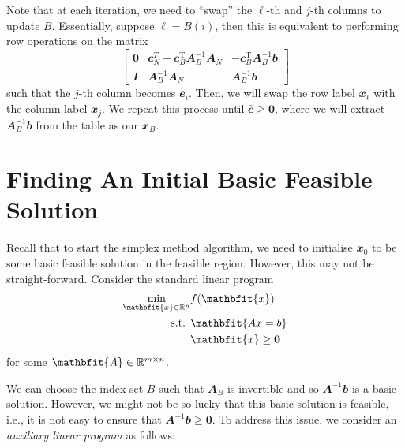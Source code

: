 \documentclass[math, code]{amznotes}
\theoremstyle{remark}
\begin{document}
Note that at each iteration, we need to ``swap'' the $\ell$-th and $j$-th columns to update $B$. Essentially, suppose $\ell = B(i)$, then this is equivalent to performing row operations on the matrix 
\begin{equation*}
    \begin{bmatrix}
        \mathbf{0} & \mathbfit{c}_N^{T} - \mathbfit{c}_B^{\mathrm{T}}\mathbfit{A}_B^{-1}\mathbfit{A}_N & -\mathbfit{c}_B^{\mathrm{T}}\mathbfit{A}_B^{-1}\mathbfit{b} \\
        \mathbfit{I} & \mathbfit{A}_B^{-1}\mathbfit{A}_N & \mathbfit{A}_B^{-1}\mathbfit{b}
    \end{bmatrix}
\end{equation*}
such that the $j$-th column becomes $\mathbfit{e}_{i}$. Then, we will swap the row label $\mathbfit{x}_{\ell}$ with the column label $\mathbfit{x}_j$. We repeat this process until $\mathbfit{\bar{c}} \geq \mathbf{0}$, where we will extract $\mathbfit{A}_B^{-1}\mathbfit{b}$ from the table as our $\mathbfit{x}_B$.
\section{Finding An Initial Basic Feasible Solution} \label{twoPhaseBigM}
Recall that to start the simplex method algorithm, we need to initialise $\mathbfit{x}_0$ to be some basic feasible solution in the feasible region. However, this may not be straight-forward. Consider the standard linear program
\begin{align*}
    \min_{\mathbfit{x} \in \R^n} & f(\mathbfit{x}) \\
    \textrm{s.t. } & \mathbfit{Ax = b} \\
    & \mathbfit{x} \geq \mathbf{0}
\end{align*}
for some $\mathbfit{A} \in \R^{m \times n}$.

We can choose the index set $B$ such that $\mathbfit{A}_B$ is invertible and so $\mathbfit{A}^{-1}\mathbfit{b}$ is a basic solution. However, we might not be so lucky that this basic solution is feasible, i.e., it is not easy to ensure that $\mathbfit{A}^{-1}\mathbfit{b} \geq \mathbf{0}$. To address this issue, we consider an \textit{auxiliary linear program} as follows:
\end{document}
